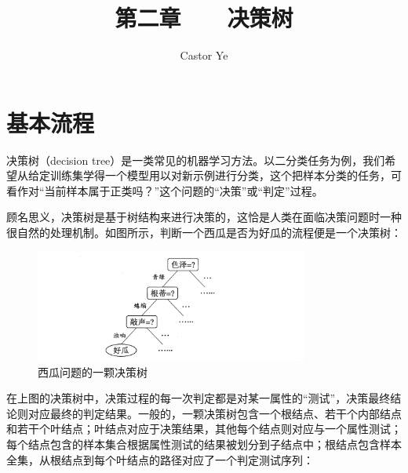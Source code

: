 \documentclass[12pt, a4paper]{article} %
\title{第二章 \ \ \ 决策树} %
\author{Castor Ye} %
\date{} %
\begin{document}
\maketitle %
\newtheorem{definition}{定义}[section]
\newtheorem{theorem}{定理}[section]
\newtheorem{example}{例}[section]
\newtheorem{solution}{题解}
\newtheorem{algorithm}{算法}
\newtheorem{axiom}{公理}
\newtheorem{property}{性质}
\newtheorem{proposition}{命题}
\newtheorem{lemma}{引理}
\newtheorem{corollary}{推论}[section]
\newtheorem{remark}{注解}
\newtheorem{condition}{条件}
\newtheorem{conclusion}{结论}
\newtheorem{assumption}{假设}
\renewcommand{\figurename}{图} %
\renewcommand{\tablename}{表} %
\section{基本流程}

决策树（decision tree）是一类常见的机器学习方法。以二分类任务为例，我们希望从给定训练集学得一个模型用以对新示例进行分类，这个把样本分类的任务，可看作对“当前样本属于正类吗？”这个问题的“决策”或“判定”过程。

顾名思义，决策树是基于树结构来进行决策的，这恰是人类在面临决策问题时一种很自然的处理机制。如图所示，判断一个西瓜是否为好瓜的流程便是一个决策树：

\begin{figure}[H]
    \centering
    \includegraphics[width=0.8\textwidth]{../img/4-1-西瓜问题的一颗决策树.png}
    \caption{西瓜问题的一颗决策树}
    \label{fig:西瓜问题的一颗决策树}
\end{figure}

在上图的决策树中，决策过程的每一次判定都是对某一属性的“测试”，决策最终结论则对应最终的判定结果。一般的，一颗决策树包含一个根结点、若干个内部结点和若干个叶结点；叶结点对应于决策结果，其他每个结点则对应与一个属性测试；每个结点包含的样本集合根据属性测试的结果被划分到子结点中；根结点包含样本全集，从根结点到每个叶结点的路径对应了一个判定测试序列：
\end{document}
